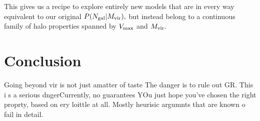 \documentclass[usenatbib,usegraphicx,letterpaper]{mn2e}
\newcommand{\vmax}{V_{\rm max}}
\newcommand{\mvir}{M_{\rm vir}}
\newcommand{\Ngal}{N_{\rm gal}}
\begin{document}
This gives us a recipe to explore entirely new models that are in every way equivalent to our original $P(\Ngal | \mvir),$ but instead belong to a continuous family of halo properties spanned by $\vmax$ and $\mvir.$

\section{Conclusion}

Going beyond vir is not just  amatter of taste The danger is to rule out GR. This i s a serious dngerCurrently, no guarantees YOu just hope you've chosen the right proprty, based on ery loittle at all. Mostly heurisic argumnts that are known o fail in detail. 



\end{document}
